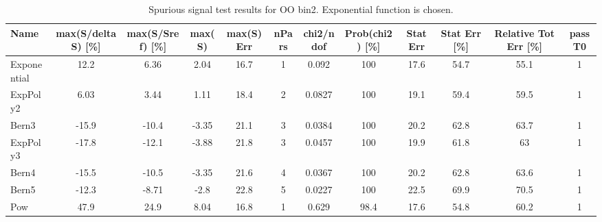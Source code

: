 \begin{landscape}
\begin{table}[]
\footnotesize
\begin{tabular}{l|ccccccccccc}
Name        & max(S/deltaS) {[}\%{]} & max(S/Sref) {[}\%{]} &  max(S) & max(S) Err & nPars & chi2/ndof & Prob(chi2) {[}\%{]} & Stat Err & Stat Err {[}\%{]} & Relative Tot Err {[}\%{]} & passT0 \\ \hline
Exponential & 12.2                   & 6.36                 &  2.04   & 16.7       & 1     & 0.092     & 100                 & 17.6     & 54.7              & 55.1                      & 1      \\
ExpPoly2    & 6.03                   & 3.44                 &  1.11   & 18.4       & 2     & 0.0827    & 100                 & 19.1     & 59.4              & 59.5                      & 1      \\
Bern3       & -15.9                  & -10.4                &  -3.35  & 21.1       & 3     & 0.0384    & 100                 & 20.2     & 62.8              & 63.7                      & 1      \\
ExpPoly3    & -17.8                  & -12.1                &  -3.88  & 21.8       & 3     & 0.0457    & 100                 & 19.9     & 61.8              & 63                        & 1      \\
Bern4       & -15.5                  & -10.5                &  -3.35  & 21.6       & 4     & 0.0367    & 100                 & 20.2     & 62.8              & 63.6                      & 1      \\
Bern5       & -12.3                  & -8.71                &  -2.8   & 22.8       & 5     & 0.0227    & 100                 & 22.5     & 69.9              & 70.5                      & 1      \\
Pow         & 47.9                   & 24.9                 &  8.04   & 16.8       & 1     & 0.629     & 98.4                & 17.6     & 54.8              & 60.2                      & 1      \\
\end{tabular}
\caption{Spurious signal test results for OO bin2. Exponential function is chosen.}
\label{tab:SSbin2}
\end{table}


\end{landscape}
